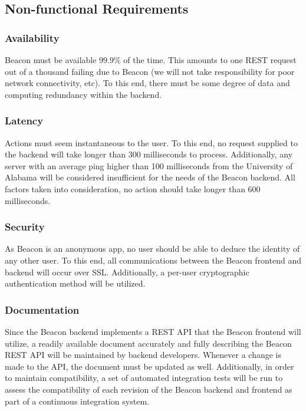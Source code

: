     \subsection{Non-functional Requirements}
        \subsubsection{Availability} 
        Beacon must be available 99.9\% of the time. This amounts to one REST request
        out of a thousand failing due to Beacon (we will not take responsibility for
        poor network connectivity, etc). To this end, there must be some degree of data
        and computing redundancy within the backend.

        \subsubsection{Latency}
        Actions must seem instantaneous to the user. To this end, no request supplied
        to the backend will take longer than 300 milliseconds to process. Additionally,
        any server with an average
        ping higher than 100 milliseconds from the University of Alabama will be
        considered insufficient for the needs of the Beacon backend. All factors taken
        into consideration, no action should take longer than 600 milliseconds.

        \subsubsection{Security}
        As Beacon is an anonymous app, no user should be able to deduce the identity of
        any other user. To this end, all communications between the Beacon frontend and
        backend will occur over SSL. Additionally, a per-user cryptographic
        authentication method will be utilized.

        \subsubsection{Documentation}
        Since the Beacon backend implements a REST API that the Beacon frontend will
        utilize, a readily available document accurately and fully describing the
        Beacon REST API will be maintained by backend developers. Whenever a change 
        is made to the API, the document must be updated as well. Additionally, in
        order to maintain compatibility, a set of automated integration tests will be
        run to assess the compatibility of each revision of the Beacon backend and
        frontend as part of a continuous integration system.

